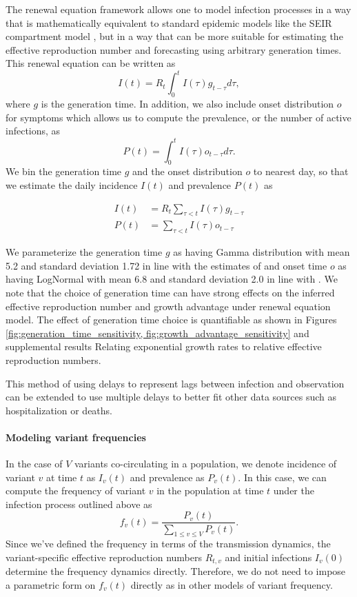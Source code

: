 \documentclass[11pt,oneside,letterpaper]{article}
\begin{document}
The renewal equation framework allows one to model infection processes in a way that is mathematically equivalent to standard epidemic models like the SEIR compartment model \cite{Champredon2018}, but in a way that can be more suitable for estimating the effective reproduction number and forecasting using arbitrary generation times. This renewal equation can be written as
\begin{equation}
  I(t) = R_{t} \int_{0}^{t} I(\tau)g_{t-\tau} d\tau,
\end{equation}
where $g$ is the generation time.
In addition, we also include onset distribution $o$ for symptoms which allows us to compute the prevalence, or the number of active infections, as
\begin{equation}
  P(t) = \int_{0}^{t} I(\tau) o_{t-\tau} d \tau.
\end{equation}
We bin the generation time $g$ and the onset distribution $o$ to nearest day, so that we estimate the daily incidence $I(t)$ and prevalence $P(t)$ as

\begin{align}
  I(t) &= R_{t} \sum_{\tau < t} I(\tau) g_{t-\tau}\\
  P(t) &= \sum_{\tau < t} I(\tau) o_{t-\tau}
\end{align}

We parameterize the generation time $g$ as having Gamma distribution with mean 5.2 and standard deviation 1.72 in line with the estimates of \cite{Ganyani2020} and onset time $o$ as having LogNormal with mean 6.8 and standard deviation 2.0 in line with \cite{Cheng2021}. We note that the choice of generation time can have strong effects on the inferred effective reproduction number and growth advantage under renewal equation model. The effect of generation time choice is quantifiable as shown in Figures \ref{fig:generation_time_sensitivity, fig:growth_advantage_sensitivity} and supplemental results Relating exponential growth rates to relative effective reproduction numbers.

This method of using delays to represent lags between infection and observation can be extended to use multiple delays to better fit other data sources such as hospitalization or deaths.

\paragraph{Modeling variant frequencies}%

In the case of $V$ variants co-circulating in a population, we denote incidence of variant $v$ at time $t$ as $I_{v}(t)$ and prevalence as $P_{v}(t)$.
In this case, we can compute the frequency of variant $v$ in the population at time $t$ under the infection process outlined above as
\begin{equation}
  f_{v}(t) = \frac{P_{v}(t)}{ \sum_{1\leq v \leq V} P_{v}(t)}.
\end{equation}
Since we've defined the frequency in terms of the transmission dynamics, the variant-specific effective reproduction numbers $R_{t,v}$ and initial infections $I_{v}(0)$ determine the frequency dynamics directly.
Therefore, we do not need to impose a parametric form on $f_{v}(t)$ directly as in other models of variant frequency.
\end{document}
